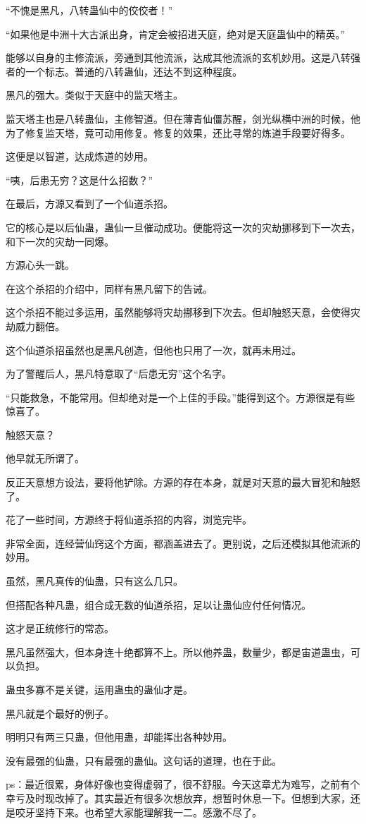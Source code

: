 \begin{this_body}
“不愧是黑凡，八转蛊仙中的佼佼者！”

“如果他是中洲十大古派出身，肯定会被招进天庭，绝对是天庭蛊仙中的精英。”

能够以自身的主修流派，旁通到其他流派，达成其他流派的玄机妙用。这是八转强者的一个标志。普通的八转蛊仙，还达不到这种程度。

黑凡的强大。类似于天庭中的监天塔主。

监天塔主也是八转蛊仙，主修智道。但在薄青仙僵苏醒，剑光纵横中洲的时候，他为了修复监天塔，竟可动用修复。修复的效果，还比寻常的炼道手段要好得多。

这便是以智道，达成炼道的妙用。

“咦，后患无穷？这是什么招数？”

在最后，方源又看到了一个仙道杀招。

它的核心是以后仙蛊，蛊仙一旦催动成功。便能将这一次的灾劫挪移到下一次去，和下一次的灾劫一同爆。

方源心头一跳。

在这个杀招的介绍中，同样有黑凡留下的告诫。

这个杀招不能过多运用，虽然能够将灾劫挪移到下次去。但却触怒天意，会使得灾劫威力翻倍。

这个仙道杀招虽然也是黑凡创造，但他也只用了一次，就再未用过。

为了警醒后人，黑凡特意取了“后患无穷”这个名字。

“只能救急，不能常用。但却绝对是一个上佳的手段。”能得到这个。方源很是有些惊喜了。

触怒天意？

他早就无所谓了。

反正天意想方设法，要将他铲除。方源的存在本身，就是对天意的最大冒犯和触怒了。

花了一些时间，方源终于将仙道杀招的内容，浏览完毕。

非常全面，连经营仙窍这个方面，都涵盖进去了。更别说，之后还模拟其他流派的妙用。

虽然，黑凡真传的仙蛊，只有这么几只。

但搭配各种凡蛊，组合成无数的仙道杀招，足以让蛊仙应付任何情况。

这才是正统修行的常态。

黑凡虽然强大，但本身连十绝都算不上。所以他养蛊，数量少，都是宙道蛊虫，可以负担。

蛊虫多寡不是关键，运用蛊虫的蛊仙才是。

黑凡就是个最好的例子。

明明只有两三只蛊，但他用蛊，却能挥出各种妙用。

没有最强的仙蛊，只有最强的蛊仙。这句话的道理，也在于此。

ps：最近很累，身体好像也变得虚弱了，很不舒服。今天这章尤为难写，之前有个幸亏及时现改掉了。其实最近有很多次想放弃，想暂时休息一下。但想到大家，还是咬牙坚持下来。也希望大家能理解我一二。感激不尽了。

\end{this_body}

